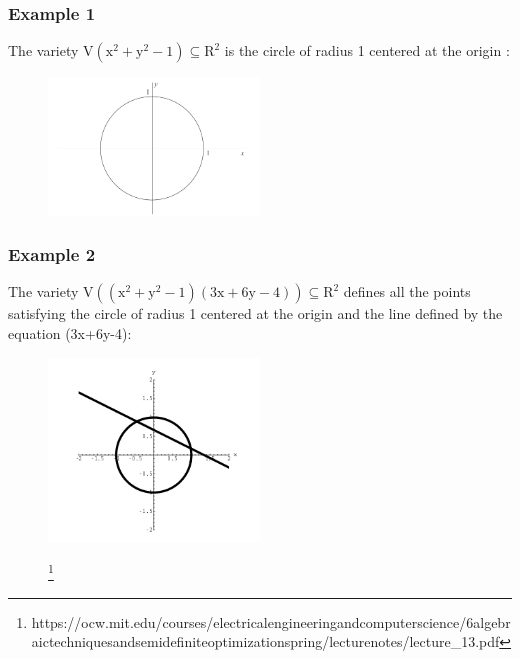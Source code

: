 \documentclass[11pt]{article}
\begin{document}
\subsubsection{Example 1}
The variety $\mathrm{V(x^2+y^2-1) \subseteq R^2}$ is the circle of radius 1 centered at the origin :
\begin{figure}[H]
  \begin{center}
    \includegraphics[width=0.50\textwidth]{circle.png}
    \caption{}
    \label{fig: }
  \end{center}
\end{figure}



\subsubsection{Example 2}
The variety $\mathrm{V((x^2+y^2-1)(3x+6y-4)) \subseteq R^2}$ defines all the points satisfying the circle of radius 1 centered at the origin and the line defined by the equation  (3x+6y-4):
\begin{figure}[H]
  \begin{center}
    \includegraphics[width=0.50\textwidth]{circle_and_line.png}
    \caption{}
    \footnote{https://ocw.mit.edu/courses/electrical\-engineering\-and\-computer\-science/6\-algebraic\-techniques\-and\-semidefinite\-optimization\-spring/lecture\-notes/lecture\_13.pdf}
    \label{fig: }
  \end{center}
\end{figure}
\end{document}
